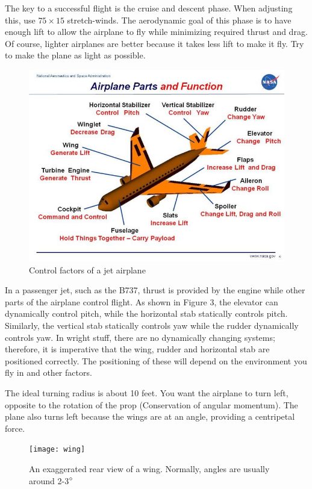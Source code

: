 \documentclass[twocolumn]{article}
\begin{document}
The key to a successful flight is the cruise and descent phase. When adjusting this, use $75\times15$ stretch-winds. The aerodynamic goal of this phase is to have enough lift to allow the airplane to fly while minimizing required thrust and drag. Of course, lighter airplanes are better because it takes less lift to make it fly. Try to make the plane as light as possible. 

\begin{figure}
\caption{Control factors of a jet airplane}
\centering
\includegraphics[scale=0.4]{parts}
\end{figure}

In a passenger jet, such as the B737, thrust is provided by the engine while other parts of the airplane control flight. As shown in Figure 3, the elevator can dynamically control pitch, while the horizontal stab statically controls pitch. Similarly, the vertical stab statically controls yaw while the rudder dynamically controls yaw. In wright stuff, there are no dynamically changing systems; therefore, it is imperative that the wing, rudder and horizontal stab are positioned correctly. The positioning of these will depend on the environment you fly in and other factors. 

The ideal turning radius is about 10 feet. You want the airplane to turn left, opposite to the rotation of the prop (Conservation of angular momentum). The plane also turns left because the wings are at an angle, providing a centripetal force. 

\begin{figure}[h]
\caption{An exaggerated rear view of a wing. Normally, angles are usually around 2-3$\degree$}
\centering
\texttt{[image: wing]}
\end{figure}
\end{document}
